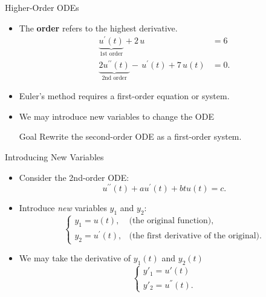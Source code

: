 \documentclass[10pt]{beamer}
\begin{document}
\begin{frame}{Higher-Order ODEs}
\begin{itemize}
    \item The \textbf{order} refers to the highest derivative. 
    \begin{align*}    
    \underbrace{u^{\prime}(t)}_{\text{1st order}} + 2\, u &= 6\\
    \underbrace{2u^{\prime\prime}(t)}_{\text{2nd order}} - \, u^\prime(t) + 7 \, u(t) &= 0.
    \end{align*}
    

    \item Euler’s method requires a first-order equation or system.\\[3mm]

    \item We may introduce new variables to change the ODE\\[3mm]

    \begin{block}{Goal}
        Rewrite the second-order ODE as a first-order system.
    \end{block}


\end{itemize}
\end{frame}

\begin{frame}{Introducing New Variables}
\begin{itemize}
    \item Consider the 2nd-order ODE:
    \[
    u^{\prime\prime}(t) + a u^\prime(t) + b t u(t) = c.
    \]

    \item Introduce \textit{new} variables $y_1$ and $y_2$:
    \[
    \begin{cases}
    y_1 = u(t), & \text{(the original function)}, \\
    y_2 = u^\prime(t), & \text{(the first derivative of the original)}.
    \end{cases}
    \]

    \item We may take the derivative of $y_1(t)$ and $y_2(t)$
    \[
    \begin{cases}
    y'_1 = u'(t) \\
    y'_2 = u^{''}(t) .
    \end{cases}
    \]
\end{itemize}
\end{frame}
\end{document}
